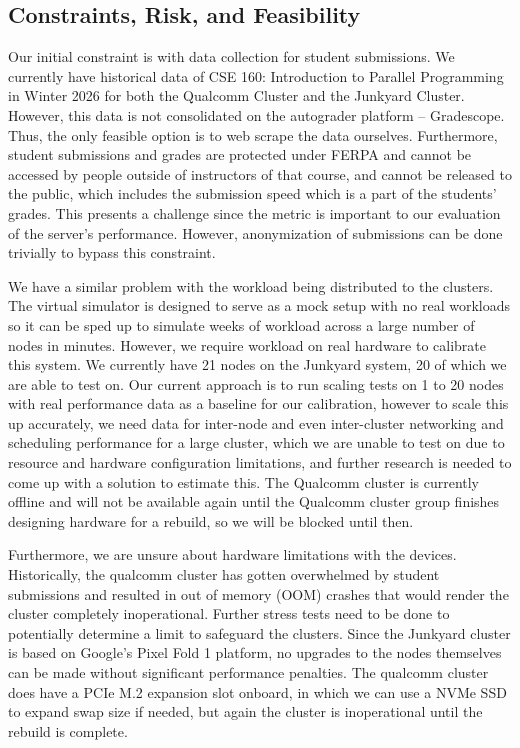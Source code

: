\documentclass{article}
\begin{document}
\subsection{Constraints, Risk, and Feasibility}


Our initial constraint is with data collection for student submissions. We currently have historical data of CSE 160: Introduction to Parallel Programming in Winter 2026 for both the Qualcomm Cluster and the Junkyard Cluster. However, this data is not consolidated on the autograder platform – Gradescope. Thus, the only feasible option is to web scrape the data ourselves. Furthermore, student submissions and grades are protected under FERPA and cannot be accessed by people outside of instructors of that course, and cannot be released to the public, which includes the submission speed which is a part of the students’ grades. This presents a challenge since the metric is important to our evaluation of the server’s performance. However, anonymization of submissions can be done trivially to bypass this constraint.

We have a similar problem with the workload being distributed to the clusters. The virtual simulator is designed to serve as a mock setup with no real workloads so it can be sped up to simulate weeks of workload across a large number of nodes in minutes. However, we require workload on real hardware to calibrate this system. We currently have 21 nodes on the Junkyard system, 20 of which we are able to test on. Our current approach is to run scaling tests on 1 to 20 nodes with real performance data as a baseline for our calibration, however to scale this up accurately, we need data for inter-node and even inter-cluster networking and scheduling performance for a large cluster, which we are unable to test on due to resource and hardware configuration limitations, and further research is needed to come up with a solution to estimate this. The Qualcomm cluster is currently offline and will not be available again until the Qualcomm cluster group finishes designing hardware for a rebuild, so we will be blocked until then.

Furthermore, we are unsure about hardware limitations with the devices. Historically, the qualcomm cluster has gotten overwhelmed by student submissions and resulted in out of memory (OOM) crashes that would render the cluster completely inoperational. Further stress tests need to be done to potentially determine a limit to safeguard the clusters. Since the Junkyard cluster is based on Google’s Pixel Fold 1 platform, no upgrades to the nodes themselves can be made without significant performance penalties. The qualcomm cluster does have a PCIe M.2 expansion slot onboard, in which we can use a NVMe SSD to expand swap size if needed, but again the cluster is inoperational until the rebuild is complete.
\end{document}
